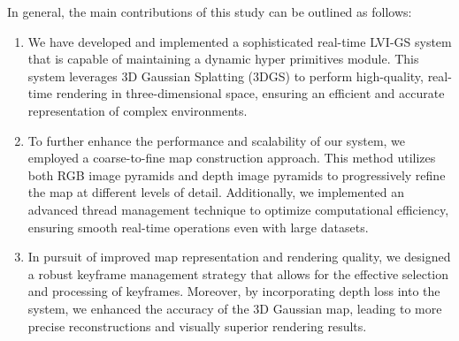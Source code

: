 \documentclass[lettersize,journal]{IEEEtran}
\begin{document}
In general, the main contributions of this study can be outlined as follows:
\begin{enumerate}
\item 
We have developed and implemented a sophisticated real-time LVI-GS system that is capable of maintaining a dynamic hyper primitives module. This system leverages 3D Gaussian Splatting (3DGS) to perform high-quality, real-time rendering in three-dimensional space, ensuring an efficient and accurate representation of complex environments.
\item 
To further enhance the performance and scalability of our system, we employed a coarse-to-fine map construction approach. This method utilizes both RGB image pyramids and depth image pyramids to progressively refine the map at different levels of detail. Additionally, we implemented an advanced thread management technique to optimize computational efficiency, ensuring smooth real-time operations even with large datasets.
\item 
In pursuit of improved map representation and rendering quality, we designed a robust keyframe management strategy that allows for the effective selection and processing of keyframes. Moreover, by incorporating depth loss into the system, we enhanced the accuracy of the 3D Gaussian map, leading to more precise reconstructions and visually superior rendering results.
\end{enumerate}
\end{document}
